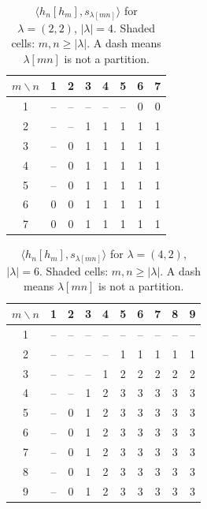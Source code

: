 \documentclass[reqno]{amsart}
\theoremstyle{plain}
\theoremstyle{definition}
\theoremstyle{remark}
\theoremstyle{plain}
\begin{document}
\begin{table}[H]\centering
\caption{$\langle h_n[h_m], s_{\lambda[mn]}\rangle$ for $\lambda=(2,2)$, $|\lambda|=4$. Shaded cells: $m,n\ge|\lambda|$. A dash means $\lambda[mn]$ is not a partition.}\label{table-22}
\begin{tabular}{c|ccccccc}
$m \backslash n$ & 1 & 2 & 3 & 4 & 5 & 6 & 7 \\ \hline
1 & -- & -- & -- & -- & -- & 0 & 0 \\
2 & -- & -- & 1 & 1 & 1 & 1 & 1 \\
3 & -- & 0 & 1 & 1 & 1 & 1 & 1 \\
4 & -- & 0 & 1 & \cellcolor{gray!25}1 & \cellcolor{gray!25}1 & \cellcolor{gray!25}1 & \cellcolor{gray!25}1 \\
5 & -- & 0 & 1 & \cellcolor{gray!25}1 & \cellcolor{gray!25}1 & \cellcolor{gray!25}1 & \cellcolor{gray!25}1 \\
6 & 0 & 0 & 1 & \cellcolor{gray!25}1 & \cellcolor{gray!25}1 & \cellcolor{gray!25}1 & \cellcolor{gray!25}1 \\
7 & 0 & 0 & 1 & \cellcolor{gray!25}1 & \cellcolor{gray!25}1 & \cellcolor{gray!25}1 & \cellcolor{gray!25}1 \\
\end{tabular}
\end{table}

\begin{table}[H]\centering
\caption{$\langle h_n[h_m], s_{\lambda[mn]}\rangle$ for $\lambda=(4,2)$, $|\lambda|=6$. Shaded cells: $m,n\ge|\lambda|$. A dash means $\lambda[mn]$ is not a partition.}\label{table-42}
\begin{tabular}{c|ccccccccc}
$m \backslash n$ & 1 & 2 & 3 & 4 & 5 & 6 & 7 & 8 & 9 \\ \hline
1 & -- & -- & -- & -- & -- & -- & -- & -- & -- \\
2 & -- & -- & -- & -- & 1 & 1 & 1 & 1 & 1 \\
3 & -- & -- & -- & 1 & 2 & 2 & 2 & 2 & 2 \\
4 & -- & -- & 1 & 2 & 3 & 3 & 3 & 3 & 3 \\
5 & -- & 0 & 1 & 2 & 3 & 3 & 3 & 3 & 3 \\
6 & -- & 0 & 1 & 2 & 3 & \cellcolor{gray!25}3 & \cellcolor{gray!25}3 & \cellcolor{gray!25}3 & \cellcolor{gray!25}3 \\
7 & -- & 0 & 1 & 2 & 3 & \cellcolor{gray!25}3 & \cellcolor{gray!25}3 & \cellcolor{gray!25}3 & \cellcolor{gray!25}3 \\
8 & -- & 0 & 1 & 2 & 3 & \cellcolor{gray!25}3 & \cellcolor{gray!25}3 & \cellcolor{gray!25}3 & \cellcolor{gray!25}3 \\
9 & -- & 0 & 1 & 2 & 3 & \cellcolor{gray!25}3 & \cellcolor{gray!25}3 & \cellcolor{gray!25}3 & \cellcolor{gray!25}3 \\
\end{tabular}
\end{table}
\end{document}
